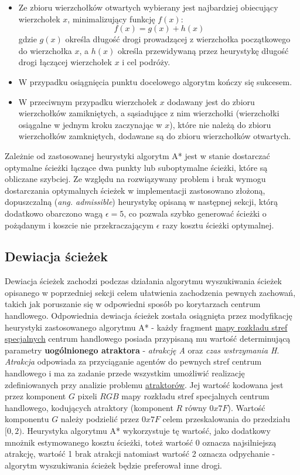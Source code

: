 \documentclass[a4paper, 12pt]{article}
\begin{document}
        \begin{itemize}
            \item Ze zbioru wierzchołków otwartych wybierany jest najbardziej obiecujący wierzchołek $x$, minimalizujący funkcję $f(x)$:
              \[ f(x) = g(x) + h(x) \]
              gdzie $g(x)$ określa długość drogi prowadzącej z wierzchołka początkowego do wierzchołka $x$, a $h(x)$ określa przewidywaną przez heurystykę długość drogi łączącej wierzchołek $x$ i cel podróży.
            \item W przypadku osiągnięcia punktu docelowego algorytm kończy się sukcesem.
            \item W przeciwnym przypadku wierzchołek $x$ dodawany jest do zbioru wierzchołków zamikniętych, a sąsiadujące z nim wierzchołki (wierzchołki osiągalne w jednym kroku zaczynając w $x$), które nie należą do zbioru wierzchołków zamkniętych, dodawane są do zbioru wierzchołków otwartych.
        \end{itemize}

\noindent
Zależnie od zastosowanej heurystyki algorytm A* jest w stanie dostarczać optymalne ścieżki łączące dwa punkty lub suboptymalne ścieżki, które są obliczane szybciej. Ze względu na rozwiązywany problem i brak wymogu dostarczania optymalnych ścieżek w implementacji zastosowano złożoną, dopuszczalną (\emph{ang. admissible}) heurystykę opisaną w następnej sekcji, którą dodatkowo obarczono wagą $\epsilon = 5$, co pozwala szybko generować ścieżki o pożądanym i koszcie nie przekraczającym $\epsilon$ razy kosztu ścieżki optymalnej.

        \subsection{Dewiacja ścieżek}
        \label{sec:path-deviation}

        Dewiacja ścieżek zachodzi podczas działania algorytmu wyszukiwania ścieżek opisanego w poprzedniej sekcji celem ułatwienia zachodzenia pewnych zachowań, takich jak poruszanie się w odpowiedni sposób po korytarzach centrum handlowego. Odpowiednia dewiacja ścieżek została osiągnięta przez modyfikację heurystyki zastosowanego algorytmu A* - każdy fragment \hyperref[fig:mall-features]{mapy rozkładu stref specjalnych} centrum handlowego posiada przypisaną mu wartość determinującą parametry \textbf{uogólnionego atraktora} - \emph{atrakcję A} oraz \emph{czas wstrzymania H}. \\

        \emph{Atrakcja} odpowiada za przyciąganie agentów do pewnych stref centrum handlowego i ma za zadanie przede wszystkim umożliwić realizację zdefiniowanych przy analizie problemu \hyperref[sec:attractors]{atraktorów}. Jej wartość kodowana jest przez komponent $G$ pixeli $RGB$ mapy rozkładu stref specjalnych centrum handlowego, kodujących atraktory (komponent $R$ równy $0x7F$). Wartość komponentu $G$ należy podzielić przez $0x7F$ celem przeskalowania do przedziału $[0, 2)$. Heurystyka algorytmu A* wykorzystuje tę wartość, jako dodatkowy mnożnik estymowanego kosztu ścieżki, toteż wartość 0 oznacza najsilniejszą atrakcję, wartość 1 brak atrakcji natomiast wartość 2 oznacza odpychanie - algorytm wyszukiwania ścieżek będzie preferował inne drogi.
\end{document}
